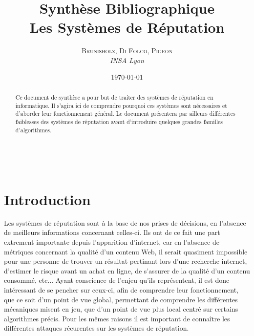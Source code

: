 \documentclass[a4paper, 11pt]{article} %
\title{\textbf{Synthèse Bibliographique}\\ %
Les Systèmes de Réputation} %
\author{\textsc{Brunisholz, Di Folco, Pigeon} %
\\{\textit{INSA Lyon}}} %
\date{\today} %
\makeatletter
\renewcommand{\maketitle}{ %
\begin{flushright} %
{\LARGE\@title} %

\vspace{50pt} %

{\large\@author} %
\\\@date %

\vspace{40pt} %
\end{flushright}
}
\makeatother
\begin{document}
\maketitle %
\tableofcontents



\begin{abstract}
	Ce document de synthèse a pour but de traiter des systèmes de réputation en informatique.
	Il s'agira ici de comprendre pourquoi ces systèmes sont nécessaires et d'aborder leur fonctionnement général.
	Le document présentera par ailleurs différentes faiblesses des systèmes de réputation avant d'introduire quelques grandes familles d'algorithmes.
\end{abstract}


\vspace{30pt} %


\section{Introduction}
Les systèmes de réputation sont à la base de nos prises de décisions, en l'absence de meilleurs informations concernant celles-ci.
Ils ont de ce fait une part extrement importante depuis l'apparition d'internet, car en l'absence de métriques concernant la qualité d'un contenu Web,
il serait quasiment impossible pour une personne de trouver un résultat pertinant lors d'une recherche internet, d'estimer le risque avant un achat en ligne,
de s'assurer de la qualité d'un contenu consommé, etc...
Ayant conscience de l'enjeu qu'ils représentent, il est donc intéressant de se pencher sur ceux-ci, afin de comprendre leur fonctionnement, que ce soit d'un point de vue global, permettant de comprendre les différentes mécaniques misent en jeu, que d'un point de vue plus local centré sur certains algorithmes précis.
Pour les mêmes raisons il est important de connaître les différentes attaques récurentes sur les systèmes de réputation.
\end{document}
